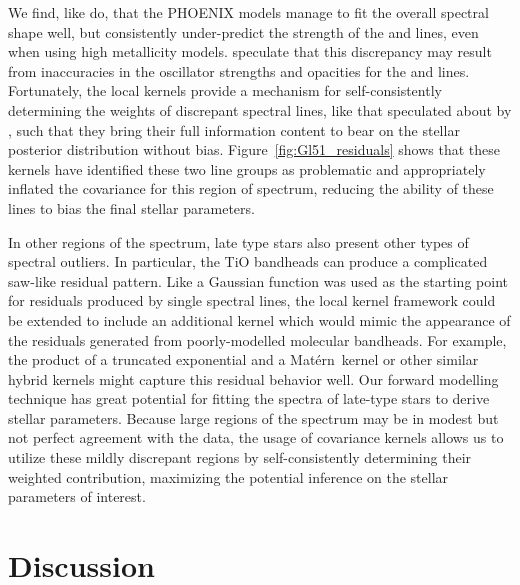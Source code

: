 \documentclass[iop,floatfix]{emulateapj}
\newcommand{\matern}{Mat\'{e}rn}
\begin{document}
We find, like \citet{rojas-ayala12} do, that the {\sc PHOENIX} models manage to fit the overall spectral shape well, but consistently under-predict the strength of the  and  lines, even when using high metallicity models. \citet{rajpurohit10} speculate that this discrepancy may result from inaccuracies in the oscillator strengths and opacities for the  and  lines. Fortunately, the local kernels provide a mechanism for self-consistently determining the weights of discrepant spectral lines, like that speculated about by \citet{mann13}, such that they bring their full information content to bear on the stellar posterior distribution without bias. Figure~\ref{fig:Gl51_residuals} shows that these kernels have identified these two line groups as problematic and appropriately inflated the covariance for this region of spectrum, reducing the ability of these lines to bias the final stellar parameters. 

In other regions of the spectrum, late type stars also present other types of spectral outliers. In particular, the TiO bandheads can produce a complicated saw-like residual pattern. Like a Gaussian function was used as the starting point for residuals produced by single spectral lines, the local kernel framework could be extended to include an additional kernel which would mimic the appearance of the residuals generated from poorly-modelled molecular bandheads. For example, the product of a truncated exponential and a \matern\ kernel or other similar hybrid kernels might capture this residual behavior well. Our forward modelling technique has great potential for fitting the spectra of late-type stars to derive stellar parameters. Because large regions of the spectrum may be in modest but not perfect agreement with the data, the usage of covariance kernels allows us to utilize these mildly discrepant regions by self-consistently determining their weighted contribution, maximizing the potential inference on the stellar parameters of interest.

\section{Discussion} \label{sec:discussion}
\end{document}
